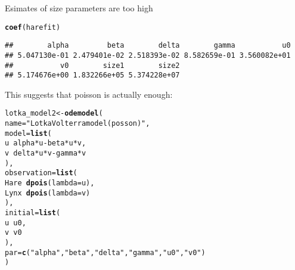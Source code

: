 \documentclass{article}\usepackage[]{graphicx}\usepackage[]{color}
\makeatletter
\newcommand{\hlstr}[1]{\textcolor[rgb]{0.192,0.494,0.8}{#1}}%
\newcommand{\hlopt}[1]{\textcolor[rgb]{0,0,0}{#1}}%
\newcommand{\hlstd}[1]{\textcolor[rgb]{0.345,0.345,0.345}{#1}}%
\newcommand{\hlkwb}[1]{\textcolor[rgb]{0.69,0.353,0.396}{#1}}%
\newcommand{\hlkwc}[1]{\textcolor[rgb]{0.333,0.667,0.333}{#1}}%
\newcommand{\hlkwd}[1]{\textcolor[rgb]{0.737,0.353,0.396}{\textbf{#1}}}%
\newenvironment{kframe}{%
 \def\at@end@of@kframe{}%
 \ifinner\ifhmode%
  \def\at@end@of@kframe{\end{minipage}}%
  \begin{minipage}{\columnwidth}%
 \fi\fi%
 \def\FrameCommand##1{\hskip\@totalleftmargin \hskip-\fboxsep
 \colorbox{shadecolor}{##1}\hskip-\fboxsep
     \hskip-\linewidth \hskip-\@totalleftmargin \hskip\columnwidth}%
 \MakeFramed {\advance\hsize-\width
   \@totalleftmargin\z@ \linewidth\hsize
   \@setminipage}}%
 {\par\unskip\endMakeFramed%
 \at@end@of@kframe}
\newenvironment{knitrout}{}{} %
\makeatother
\begin{document}
Esimates of size parameters are too high
\begin{knitrout}
\color{fgcolor}\begin{kframe}
\begin{alltt}
\hlkwd{coef}\hlstd{(harefit)}
\end{alltt}
\begin{verbatim}
##        alpha         beta        delta        gamma           u0 
## 5.047130e-01 2.479401e-02 2.518393e-02 8.582659e-01 3.560082e+01 
##           v0        size1        size2 
## 5.174676e+00 1.832266e+05 5.374228e+07
\end{verbatim}
\end{kframe}
\end{knitrout}
This suggests that poisson is actually enough:
\begin{knitrout}
\color{fgcolor}\begin{kframe}
\begin{alltt}
\hlstd{lotka_model2} \hlkwb{<-} \hlkwd{odemodel}\hlstd{(}
    \hlkwc{name}\hlstd{=}\hlstr{"Lotka Volterra model (posson)"}\hlstd{,}
    \hlkwc{model}\hlstd{=}\hlkwd{list}\hlstd{(}
        \hlstd{u} \hlopt{~} \hlstd{alpha} \hlopt{*} \hlstd{u} \hlopt{-} \hlstd{beta} \hlopt{*} \hlstd{u} \hlopt{*} \hlstd{v,}
        \hlstd{v} \hlopt{~} \hlstd{delta} \hlopt{*} \hlstd{u} \hlopt{*} \hlstd{v} \hlopt{-} \hlstd{gamma} \hlopt{*} \hlstd{v}
    \hlstd{),}
    \hlkwc{observation}\hlstd{=}\hlkwd{list}\hlstd{(}
        \hlstd{Hare} \hlopt{~} \hlkwd{dpois}\hlstd{(}\hlkwc{lambda}\hlstd{=u),}
        \hlstd{Lynx} \hlopt{~} \hlkwd{dpois}\hlstd{(}\hlkwc{lambda}\hlstd{=v)}
    \hlstd{),}
    \hlkwc{initial}\hlstd{=}\hlkwd{list}\hlstd{(}
        \hlstd{u} \hlopt{~} \hlstd{u0,}
        \hlstd{v} \hlopt{~} \hlstd{v0}
    \hlstd{),}
    \hlkwc{par}\hlstd{=}\hlkwd{c}\hlstd{(}\hlstr{"alpha"}\hlstd{,} \hlstr{"beta"}\hlstd{,} \hlstr{"delta"}\hlstd{,} \hlstr{"gamma"}\hlstd{,} \hlstr{"u0"}\hlstd{,} \hlstr{"v0"}\hlstd{)}
\hlstd{)}
\end{alltt}
\end{kframe}
\end{knitrout}
\end{document}
